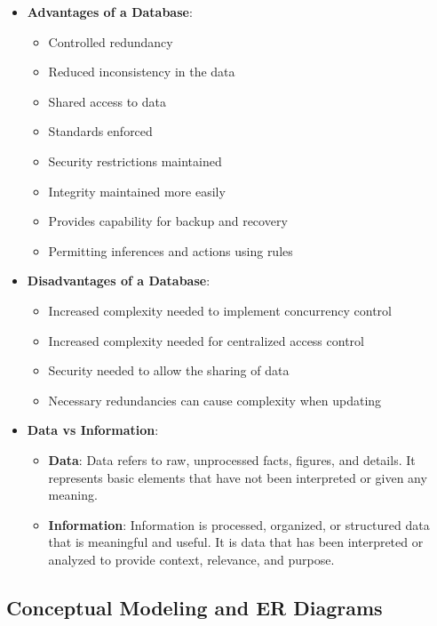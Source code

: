 \documentclass{report}
\begin{document}
\begin{itemize}
        \item \textbf{Advantages of a Database}:
            \begin{itemize}
                \item Controlled redundancy
                \item Reduced inconsistency in the data
                \item Shared access to data
                \item Standards enforced
                \item Security restrictions maintained
                \item Integrity maintained more easily
                \item Provides capability for backup and recovery
                \item Permitting inferences and actions using rules
            \end{itemize}
        \item \textbf{Disadvantages of a Database}:
            \begin{itemize}
                \item Increased complexity needed to implement concurrency control
                \item Increased complexity needed for centralized access control
                \item Security needed to allow the sharing of data
                \item Necessary redundancies can cause complexity when updating
            \end{itemize}
        \item \textbf{Data vs Information}:
            \begin{itemize}
                \item \textbf{Data}: Data refers to raw, unprocessed facts, figures, and details. It represents basic elements that have not been interpreted or given any meaning.
                \item \textbf{Information}: Information is processed, organized, or structured data that is meaningful and useful. It is data that has been interpreted or analyzed to provide context, relevance, and purpose.
            \end{itemize}
    \end{itemize}

    \pagebreak 
    \subsection{Conceptual Modeling and ER Diagrams}
    \bigbreak \noindent 
\end{document}
